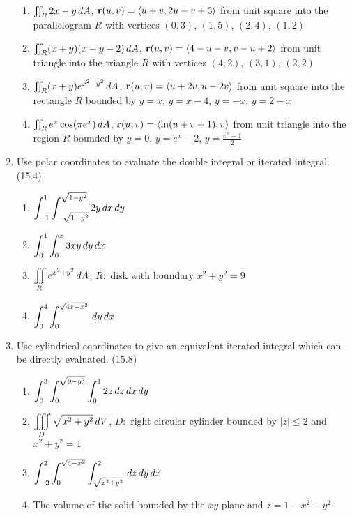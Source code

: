 \begin{enumerate}
      \begin{enumerate}
        \item $\iint_R 2x-y\,d{A}$, $\mathbf{r}(u,v)=\left<u+v,2u-v+3\right>$ from unit square into the parallelogram $R$ with vertices $(0,3)$, $(1,5)$, $(2,4)$, $(1,2)$
        \item $\iint_R (x+y)(x-y-2)\,d{A}$, $\mathbf{r}(u,v)=\left<4-u-v,v-u+2\right>$ from unit triangle into the triangle $R$ with vertices $(4,2)$, $(3,1)$, $(2,2)$
        \item $\iint_R (x+y)e^{x^2-y^2}\,d{A}$, $\mathbf{r}(u,v)=\left<u+2v,u-2v\right>$ from unit square into the rectangle $R$ bounded by $y=x$, $y=x-4$, $y=-x$, $y=2-x$
        \item $\iint_R e^x\cos(\pi e^x)\,d{A}$, $\mathbf{r}(u,v)=\left<\ln (u+v+1),v\right>$ from unit triangle into the region $R$ bounded by $y=0$, $y=e^x-2$, $y=\frac{e^x-1}{2}$
      \end{enumerate}

    \newpage

    \item Use polar coordinates to evaluate the double integral or iterated integral. (15.4)

      \begin{enumerate}
        \item $\displaystyle\int_{-1}^1\int_{-\sqrt{1-y^2}}^{\sqrt{1-y^2}} 2y\,d{x}\,d{y}$
        \item $\displaystyle\int_0^1\int_0^x 3xy\,d{y}\,d{x}$
        \item $\displaystyle\iint_R e^{x^2+y^2}\,d{A}$, $R:$ disk with boundary $x^2+y^2=9$
        \item $\displaystyle\int_{0}^4\int_0^{\sqrt{4x-x^2}} \,d{y}\,d{x}$
      \end{enumerate}

    \item Use cylindrical coordinates to give an equivalent iterated integral which can be directly evaluated. (15.8)

      \begin{enumerate}
        \item $\displaystyle\int_0^3\int_0^{\sqrt{9-y^2}}\int_0^1 2z\,d{z}\,d{x}\,d{y}$
        \item $\displaystyle\iiint_D \sqrt{x^2+y^2}\,d{V}$, $D:$ right circular cylinder bounded by $|z|\leq 2$ and $x^2+y^2=1$
        \item $\displaystyle\int_{-2}^2\int_0^{\sqrt{4-x^2}}\int_{\sqrt{x^2+y^2}}^2 \,d{z}\,d{y}\,d{x}$
        \item The volume of the solid bounded by the $xy$ plane and $z=1-x^2-y^2$
      \end{enumerate}


\end{enumerate}
